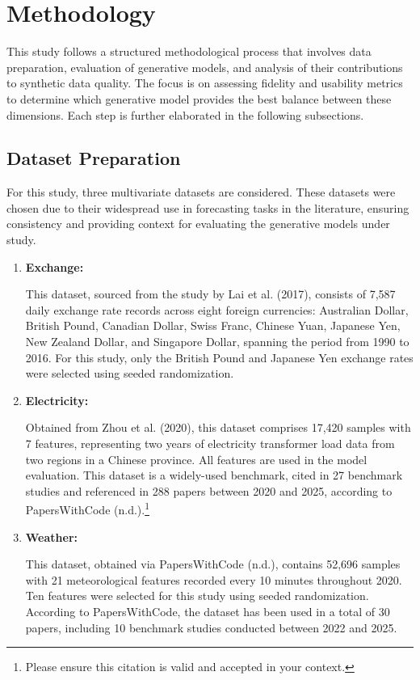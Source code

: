 \documentclass{article}
\begin{document}
\section{Methodology}
This study follows a structured methodological process that involves data preparation, evaluation of generative models, and analysis of their contributions to synthetic data quality. The focus is on assessing fidelity and usability metrics to determine which generative model provides the best balance between these dimensions. Each step is further elaborated in the following subsections.

\subsection{Dataset Preparation}
For this study, three multivariate datasets are considered. These datasets were chosen due to their widespread use in forecasting tasks in the literature, ensuring consistency and providing context for evaluating the generative models under study.

\begin{enumerate}
    \item \textbf{Exchange:} 
    
    This dataset, sourced from the study by Lai et al. (2017), consists of 7,587 daily exchange rate records across eight foreign currencies: Australian Dollar, British Pound, Canadian Dollar, Swiss Franc, Chinese Yuan, Japanese Yen, New Zealand Dollar, and Singapore Dollar, spanning the period from 1990 to 2016. For this study, only the British Pound and Japanese Yen exchange rates were selected using seeded randomization.

    \item \textbf{Electricity:} 
    
    Obtained from Zhou et al. (2020), this dataset comprises 17,420 samples with 7 features, representing two years of electricity transformer load data from two regions in a Chinese province. All features are used in the model evaluation. This dataset is a widely-used benchmark, cited in 27 benchmark studies and referenced in 288 papers between 2020 and 2025, according to PapersWithCode (n.d.).\footnote{Please ensure this citation is valid and accepted in your context.}

    
    \item \textbf{Weather:} 

    This dataset, obtained via PapersWithCode (n.d.), contains 52,696 samples with 21 meteorological features recorded every 10 minutes throughout 2020. Ten features were selected for this study using seeded randomization. According to PapersWithCode, the dataset has been used in a total of 30 papers, including 10 benchmark studies conducted between 2022 and 2025.



\end{enumerate}
\end{document}
